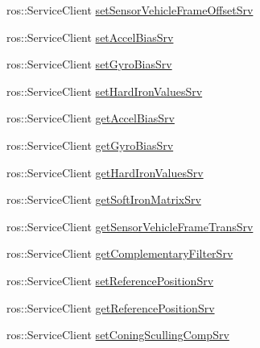 \begin{DoxyCompactItemize}
\item 
ros\+::\+Service\+Client \hyperlink{classcl__microstrain__mips__client_1_1ClMicrostainMips_aa04c70e0ed33354a79183e58c0a6b562}{set\+Sensor\+Vehicle\+Frame\+Offset\+Srv}
\item 
ros\+::\+Service\+Client \hyperlink{classcl__microstrain__mips__client_1_1ClMicrostainMips_a236933f60d57e7ae1dcbea487948b929}{set\+Accel\+Bias\+Srv}
\item 
ros\+::\+Service\+Client \hyperlink{classcl__microstrain__mips__client_1_1ClMicrostainMips_a2b81c924448389dd56436e334d4ab67e}{set\+Gyro\+Bias\+Srv}
\item 
ros\+::\+Service\+Client \hyperlink{classcl__microstrain__mips__client_1_1ClMicrostainMips_ac70bd31f9656c44e6bd7e4e5cc52c3a1}{set\+Hard\+Iron\+Values\+Srv}
\item 
ros\+::\+Service\+Client \hyperlink{classcl__microstrain__mips__client_1_1ClMicrostainMips_af18936b698579e63404fb143f5945fab}{get\+Accel\+Bias\+Srv}
\item 
ros\+::\+Service\+Client \hyperlink{classcl__microstrain__mips__client_1_1ClMicrostainMips_ad690945c866bb3e3b5e465bb838bacef}{get\+Gyro\+Bias\+Srv}
\item 
ros\+::\+Service\+Client \hyperlink{classcl__microstrain__mips__client_1_1ClMicrostainMips_a51a981a977a5141f4c417c947dc40e71}{get\+Hard\+Iron\+Values\+Srv}
\item 
ros\+::\+Service\+Client \hyperlink{classcl__microstrain__mips__client_1_1ClMicrostainMips_a8afab460c259396c582a0d583d593023}{get\+Soft\+Iron\+Matrix\+Srv}
\item 
ros\+::\+Service\+Client \hyperlink{classcl__microstrain__mips__client_1_1ClMicrostainMips_abfc167ed3141a0253dac8258f5092b6f}{get\+Sensor\+Vehicle\+Frame\+Trans\+Srv}
\item 
ros\+::\+Service\+Client \hyperlink{classcl__microstrain__mips__client_1_1ClMicrostainMips_a0dce6daea65bfc730496c95025cbc403}{get\+Complementary\+Filter\+Srv}
\item 
ros\+::\+Service\+Client \hyperlink{classcl__microstrain__mips__client_1_1ClMicrostainMips_ada68e40ee78a5182c1f6b7d4eea82442}{set\+Reference\+Position\+Srv}
\item 
ros\+::\+Service\+Client \hyperlink{classcl__microstrain__mips__client_1_1ClMicrostainMips_ab26c6d6bc20f6816761d7d2166bcf5e7}{get\+Reference\+Position\+Srv}
\item 
ros\+::\+Service\+Client \hyperlink{classcl__microstrain__mips__client_1_1ClMicrostainMips_a213636f3a6b6274751a60a13a5fa3a97}{set\+Coning\+Sculling\+Comp\+Srv}

\end{DoxyCompactItemize}
